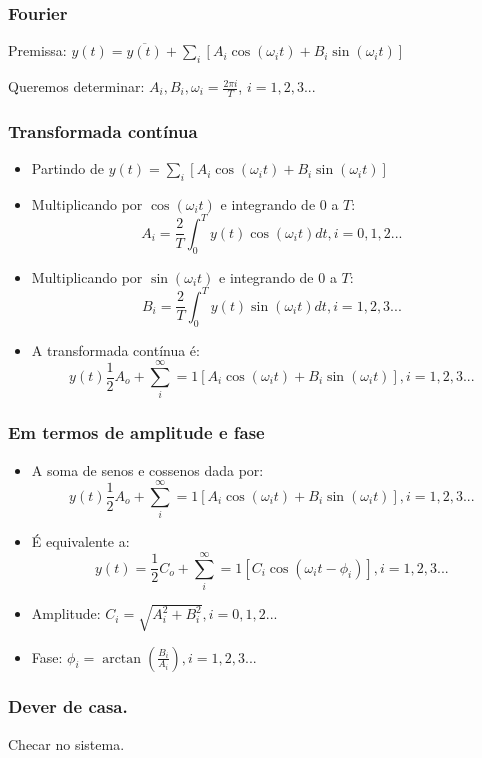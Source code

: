 \begin{frame}
\frametitle{Fourier}
    \begin{block}{}
      Premissa: $y(t) = \overline{y(t)} + \sum_i\left[ A_i\cos(\omega_it) + B_i\sin(\omega_it) \right]$
    \end{block}
    \pause
    \begin{block}{}
      Queremos determinar: $A_i, B_i, \omega_i = \frac{2\pi i}{T}$, $i=1,2,3...$
    \end{block}
\end{frame}


\begin{frame}
\frametitle{Transformada contínua}
\footnotesize{
  \begin{itemize}[<+-| alert@+>]
    \item Partindo de $y(t) = \sum_i\left[ A_i\cos(\omega_it) + B_i\sin(\omega_it) \right]$
    \item Multiplicando por $\cos(\omega_it)$ e integrando de 0 a $T$:\\
    $$A_i = \frac{2}{T}\int^T_0y(t)\cos(\omega_it)dt, i=0,1,2...$$
    \item Multiplicando por $\sin(\omega_it)$ e integrando de 0 a $T$:\\
    $$B_i = \frac{2}{T}\int^T_0y(t)\sin(\omega_it)dt, i=1,2,3...$$
    \item A transformada contínua é:
    $$y(t) \frac{1}{2}A_o + \sum^{\infty}_i=1\left[A_i\cos(\omega_it) + B_i\sin(\omega_it)\right], i=1,2,3...$$
    \end{itemize}
    }
\end{frame}


\begin{frame}
\frametitle{Em termos de amplitude e fase}
\footnotesize{
  \begin{itemize}[<+-| alert@+>]
    \item A soma de senos e cossenos dada por:
    $$y(t) \frac{1}{2}A_o + \sum^{\infty}_i=1\left[A_i\cos(\omega_it) + B_i\sin(\omega_it)\right], i=1,2,3...$$
    \item É equivalente a:\\
    $$y(t)=\frac{1}{2}C_o + \sum^{\infty}_i=1\left[C_i\cos(\omega_it-\phi_i)\right], i=1,2,3...$$
    \item Amplitude: $C_i = \sqrt{A^2_i + B^2_i}, i=0,1,2...$
    \item Fase: $\phi_i = \arctan\left({\frac{B_i}{A_i}}\right), i=1,2,3...$
    \end{itemize}
    }
\end{frame}


\begin{frame}
\frametitle{Dever de casa.}
    \begin{block}{}
    Checar no sistema.
    \end{block}
\end{frame}


